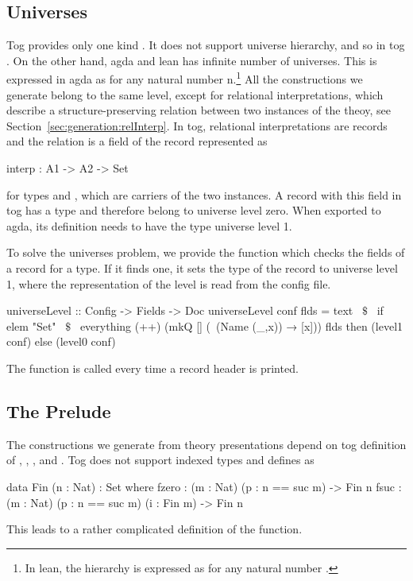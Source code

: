 \subsection{Universes}
Tog provides only one kind . It does not support universe hierarchy, and so in tog . On the other hand, agda and lean has infinite number of universes. This is expressed in agda as 
 for any natural number $\text{n}$.\footnote{In lean, the hierarchy is expressed as  for any natural number .}
All the constructions we generate belong to the same level, except for relational interpretations, which describe a structure-preserving relation between two instances of the theoy, see Section~\ref{sec:generation:relInterp}. In tog, relational interpretations are records and the relation is a field of the record represented as 
\begin{togcode}
interp : A1 -> A2 -> Set
\end{togcode}
for types  and , which are carriers of the two instances. 
A record with this field in tog has a type  and therefore belong to universe level zero. When exported to agda, its definition needs to have the type universe level 1.  

To solve the universes problem, we provide the function  which checks the fields of a record for a  type. If it finds one, it sets the type of the record to universe level 1, where the representation of the level is read from the config file. 
\begin{hscode}
universeLevel :: Config -> Fields -> Doc
universeLevel conf flds =
  text ~$\$$~
    if elem "Set" ~$\$$~ everything (++) (mkQ [] (\ (Name (_,x)) → [x])) flds
    then (level1 conf) else (level0 conf)    
\end{hscode}
The function  is called every time a record header is printed. 

\subsection{The Prelude}
The constructions we generate from theory presentations depend on tog definition of , , , and . Tog does not support indexed types and defines  as  
\begin{togcode}
data Fin (n : Nat) : Set where
  fzero : (m : Nat) (p : n == suc m) -> Fin n
  fsuc  : (m : Nat) (p : n == suc m) (i : Fin m) -> Fin n
\end{togcode}
This leads to a rather complicated definition of the  function. 

